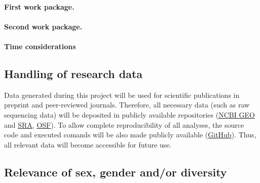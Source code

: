 \documentclass[final]{scrartcl}
\begin{document}
\hrulefill
\paragraph{First work package.}
\label{wp:1}

\hrulefill
\paragraph{Second work package.}
\label{wp:2}



\let\theparagraph=\oldpara
\paragraph*{Time considerations}

\subsection{Handling of research data}
Data generated during this project will be used for scientific publications in
preprint and peer-reviewed journals. Therefore, all necessary data (such as raw
sequencing data) will be deposited in publicly available repositories
(\href{https://www.ncbi.nlm.nih.gov/geo/}{NCBI GEO} and
\href{https://www.ncbi.nlm.nih.gov/sra}{SRA}, \href{https://osf.io/}{OSF}). To
allow complete reproducibility of all analyses, the source code and executed
comands will be also made publicly available
(\href{https://github.com/}{GitHub}).  Thus, all relevant data will become
accessible for future use. 

\subsection{Relevance of sex, gender and/or diversity}

\end{document}

